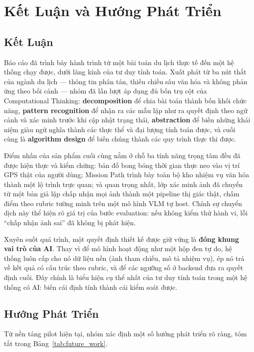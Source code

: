 \section{Kết Luận và Hướng Phát Triển}

\subsection{Kết Luận}
\contrib

Báo cáo đã trình bày hành trình từ một bài toán du lịch thực tế đến một
hệ thống chạy được, dưới lăng kính của tư duy tính toán. Xuất phát từ ba
nút thắt của ngành du lịch --- thông tin phân tán, thiếu chiều sâu văn
hóa và không phản ứng theo bối cảnh --- nhóm đã lần lượt áp dụng đủ bốn
trụ cột của Computational Thinking: \textbf{decomposition} để chia bài
toán thành bốn khối chức năng, \textbf{pattern recognition} để nhận ra
các mẫu lặp như ra quyết định theo ngữ cảnh và xác minh trước khi cập
nhật trạng thái, \textbf{abstraction} để biến những khái niệm giàu ngữ
nghĩa thành các thực thể và đại lượng tính toán được, và cuối cùng là
\textbf{algorithm design} để biến chúng thành các quy trình thực thi được.

Điểm nhấn của sản phẩm cuối cùng nằm ở chỗ ba tính năng trọng tâm đều đã
được hiện thực và kiểm chứng: bản đồ bong bóng thời gian thực neo vào vị
trí GPS thật của người dùng; Mission Path trình bày toàn bộ kho nhiệm vụ
văn hóa thành một lộ trình trực quan; và quan trọng nhất, lớp xác minh
ảnh đã chuyển từ một bản giả lập chấp nhận mọi ảnh thành một pipeline thị
giác thật, chấm điểm theo rubric tường minh trên một mô hình VLM tự host.
Chính sự chuyển dịch này thể hiện rõ giá trị của bước evaluation: nếu
không kiểm thử hành vi, lỗi ``chấp nhận ảnh sai'' đã không bị phát hiện.

Xuyên suốt quá trình, một quyết định thiết kế được giữ vững là
\textbf{đóng khung vai trò của AI}. Thay vì để mô hình hoạt động như một
hộp đen tự do, hệ thống luôn cấp cho nó dữ liệu nền (ảnh tham chiếu, mô
tả nhiệm vụ), ép nó trả về kết quả có cấu trúc theo rubric, và để các
ngưỡng số ở backend đưa ra quyết định cuối. Đây chính là biểu hiện cụ thể
nhất của tư duy tính toán trong một hệ thống có AI: biến cái định tính
thành cái kiểm soát được.

\subsection{Hướng Phát Triển}
\contrib

Từ nền tảng pilot hiện tại, nhóm xác định một số hướng phát triển rõ ràng,
tóm tắt trong Bảng~\ref{tab:future_work}.

